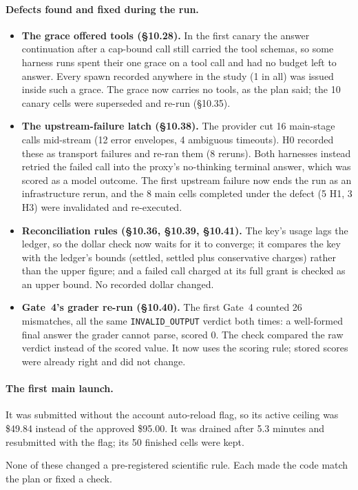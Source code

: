 \documentclass[11pt]{article}
\begin{document}
\paragraph{Defects found and fixed during the run.}
\begin{itemize}
\item \textbf{The grace offered tools (\S10.28).} In the first canary the answer continuation after a cap-bound
call still carried the tool schemas, so some harness runs spent their one grace on a tool call and had no budget left
to answer. Every spawn recorded anywhere in the study (1 in all) was issued inside
such a grace. The grace now carries no tools, as the plan said; the 10 canary cells were
superseded and re-run (\S10.35).
\item \textbf{The upstream-failure latch (\S10.38).} The provider cut 16 main-stage
calls mid-stream (12 error envelopes, 4
ambiguous timeouts). H0 recorded these as transport failures and re-ran them
(8 reruns). Both harnesses instead retried the failed call into the proxy's
no-thinking terminal answer, which was scored as a model outcome. The first upstream failure now ends the run as an
infrastructure rerun, and the 8 main cells completed under the defect
(5 H1, 3 H3) were
invalidated and re-executed.
\item \textbf{Reconciliation rules (\S10.36, \S10.39, \S10.41).} The key's usage lags the ledger, so the dollar
check now waits for it to converge; it compares the key with the ledger's bounds (settled, settled plus
conservative charges) rather than the upper figure; and a failed call charged at its full grant is checked as an
upper bound. No recorded dollar changed.
\item \textbf{Gate~4's grader re-run (\S10.40).} The first Gate~4 counted
26 mismatches, all the same \texttt{INVALID\_OUTPUT} verdict both times: a
well-formed final answer the grader cannot parse, scored 0. The check compared the raw verdict instead of the
scored value. It now uses the scoring rule; stored scores were already right and did not change.
\end{itemize}

\paragraph{The first main launch.} It was submitted without the account auto-reload flag, so its active ceiling
was \$49.84 instead of the approved \$95.00.
It was drained after 5.3 minutes and resubmitted with the flag; its
50 finished cells were kept.

None of these changed a pre-registered scientific rule. Each made the code match the plan or fixed a check.
\end{document}

